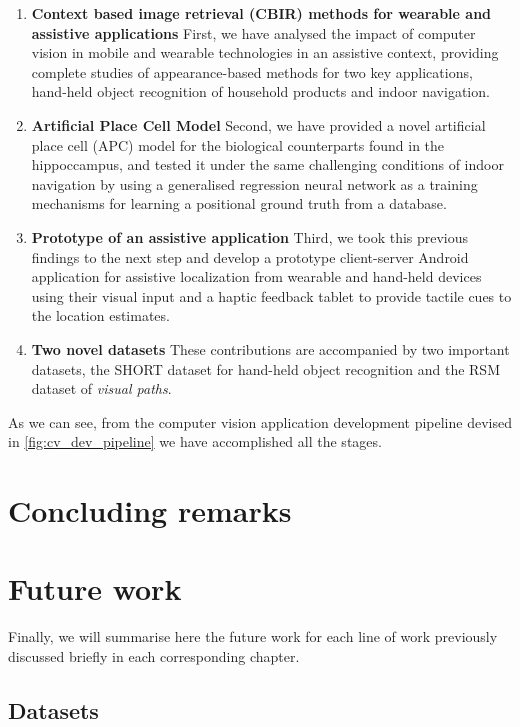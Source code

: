 \begin{enumerate}
\item \textbf{Context based image retrieval (CBIR) methods for wearable and assistive applications} First, we have analysed the impact of computer vision in mobile and wearable technologies in an assistive context, providing complete studies of appearance-based methods for two key applications, hand-held object recognition of household products and indoor navigation.

\item \textbf{Artificial Place Cell Model} Second, we have provided a novel artificial place cell (APC) model for the biological counterparts found in the hippoccampus, and tested it under the same challenging conditions of indoor navigation by using a generalised regression neural network as a training mechanisms for learning a positional ground truth from a database.

\item \textbf{Prototype of an assistive application} Third, we took this previous findings to the next step and develop a prototype client-server Android application for assistive localization from wearable and hand-held devices using their visual input and a haptic feedback tablet to provide tactile cues to the location estimates.


\item \textbf{Two novel datasets} These contributions are accompanied by two important datasets, the SHORT dataset for hand-held object recognition and the RSM dataset of \emph{visual paths}.

\end{enumerate}

As we can see, from the computer vision application development pipeline devised in \ref{fig:cv_dev_pipeline} we have accomplished all the stages.

\section{Concluding remarks}

\section{Future work}

Finally, we will summarise here the future work for each line of work previously discussed briefly in each corresponding chapter.

\subsection{Datasets}

